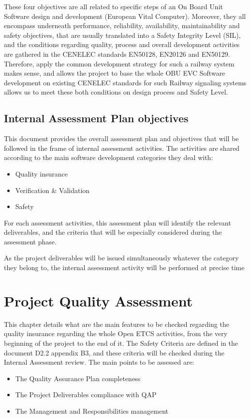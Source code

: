 \documentclass{template/openetcs_report}
\begin{document}
These four objectives are all related to specific steps of an On Board Unit Software design and development (European Vital Computer). Moreover, they all encompass underneath performance, reliability, availability, maintainability and safety objectives, that are usually translated into a Safety Integrity Level (SIL), and the conditions regarding quality, process and overall development activities are gathered in the CENELEC standards EN50128, EN20126 and EN50129.
Therefore, apply the common development strategy for such a railway system makes sense, and allows the project to base the whole OBU EVC Software development on existing CENELEC standards for such Railway signaling systems allows us to meet these both conditions on design process and Safety Level.

\subsection{Internal Assessment Plan objectives}
This document provides the overall assessment plan and objectives that will be followed in the frame of internal assessment activities.
The activities are shared according to the main software development categories they deal with:
\begin{itemize}
\item Quality insurance
\item Verification \& Validation
\item Safety
\end{itemize}

For each assessment activities, this assessment plan will identify the relevant deliverables, and the criteria that will be especially considered during the assessment phase.

As the project deliverables will be issued simultaneously whatever the category they belong to, the internal assessment activity will be performed at precise time

\section{Project Quality Assessment}
This chapter details what are the main features to be checked regarding the quality insurance regarding the whole Open ETCS activities, from the very beginning of the project to the end of it.
The Safety Criteria are defined in the document D2.2 appendix B3, and these criteria will be checked during the Internal Assessment review. The main points to be assessed are:
\begin{itemize}
\item The Quality Assurance Plan completeness
\item The Project Deliverables compliance with QAP
\item The Management and Responsibilities management 
\end{itemize}
\end{document}
